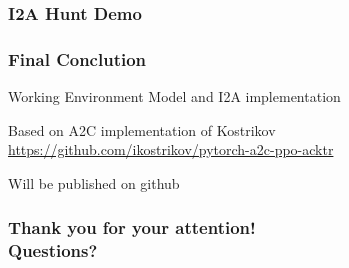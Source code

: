 \begin{frame}
    \frametitle{I2A Hunt Demo}
    
\end{frame}
\clearpage

\begin{frame}
    \frametitle{Final Conclution}

\begin{PraesentationAufzaehlung}
	\item Working Environment Model and I2A implementation
	\item Based on A2C implementation of Kostrikov \url{https://github.com/ikostrikov/pytorch-a2c-ppo-acktr} 
	\item Will be published on github
\end{PraesentationAufzaehlung}
    
\end{frame}
\clearpage


\begin{frame}
    \frametitle{Thank you for your attention! \vspace{15mm}
	 \\Questions?}
    
\end{frame}
\clearpage



